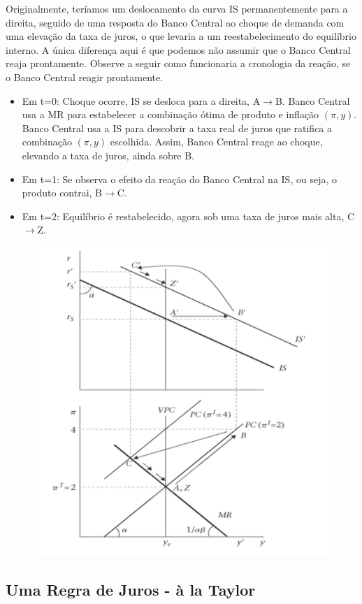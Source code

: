 \documentclass[a4paper,12pt]{article}[abntex2]
\begin{document}
Originalmente, teríamos um deslocamento da curva IS permanentemente para a direita, seguido de uma resposta do Banco Central ao choque de demanda com uma elevação da taxa de juros, o que levaria a um reestabelecimento do equilíbrio interno. A única diferença aqui é que podemos não assumir que o Banco Central reaja prontamente. Observe a seguir como funcionaria a cronologia da reação, se o Banco Central reagir prontamente.

\begin{itemize}
    \item Em t=0: Choque ocorre, IS se desloca para a direita, A$\rightarrow$B. Banco Central usa a MR para estabelecer a combinação ótima de produto e inflação $(\pi, y)$. Banco Central usa a IS para descobrir a taxa real de juros que ratifica a combinação $(\pi, y)$ escolhida. Assim, Banco Central reage ao choque, elevando a taxa de juros, ainda sobre B.
    \item Em t=1: Se observa o efeito da reação do Banco Central na IS, ou seja, o produto contrai, B$\rightarrow$C.
    \item Em t=2: Equilíbrio é restabelecido, agora sob uma taxa de juros mais alta, C$\rightarrow$Z.
\end{itemize}

\begin{figure}[H]
    \centering
    \includegraphics[width=0.7\linewidth]{Imagens/a15i11.png}
\end{figure}

\subsection{\textbf{Uma Regra de Juros - à la Taylor}}
\end{document}
